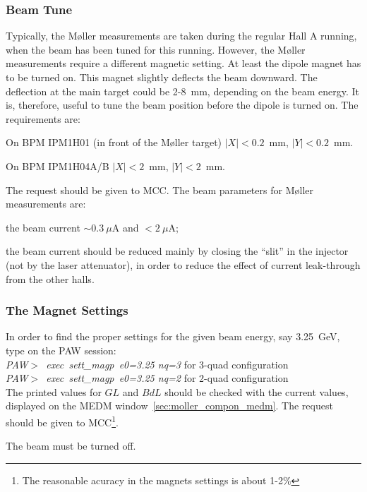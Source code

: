 {\subsubsection {Beam Tune}
\label{sec:moller_oper_beam}
 Typically, the M{\o}ller measurements are taken during the regular Hall A
 running, when the beam has been tuned for this running. However,
 the M{\o}ller measurements require a different magnetic setting.
 At least the dipole magnet has to be turned on. This magnet
 slightly deflects the beam downward. The deflection at the main target
 could be 2-8~mm, depending on the beam energy. It is, therefore, 
 useful to tune the beam position before the dipole is turned on.
 The requirements are: 
 \begin{list}{--}{\setlength{\itemsep}{-0.15cm}}
   \item On BPM IPM1H01 (in front of the M{\o}ller target) $|X|<0.2$~mm, $|Y|<0.2$~mm.
   \item On BPM IPM1H04A/B $|X|<2$~mm, $|Y|<2$~mm.
 \end{list}
 The request should be given to MCC. The beam parameters for M{\o}ller measurements
 are: 
   \begin{list}{--}{\setlength{\itemsep}{-0.15cm}}        
     \item \begin{safetyen}{5}{0} the beam current $\sim{}0.3~\mu$A and $<2~\mu$A;
            \end{safetyen}
     \item the beam current should be reduced mainly by closing the ``slit''
           in the injector (not by the laser attenuator), in order to
           reduce the effect of current leak-through from the other halls.
   \end{list}

\subsubsection {The Magnet Settings}
\label{sec:moller_oper_magset}
 In order to find the proper settings for the given beam energy, say 3.25~GeV, 
 type on the PAW session: \\ 
 \hspace*{0.5cm} {\em PAW$>$~exec~sett\_magp~e0=3.25 nq=3} for 3-quad configuration \\
 \hspace*{0.5cm} {\em PAW$>$~exec~sett\_magp~e0=3.25 nq=2} for 2-quad configuration \\
 The printed values for $GL$ and $BdL$ should be checked with the current values,
 displayed on the MEDM window~\ref{sec:moller_compon_medm}. 
 The request should be given to MCC\footnote{The reasonable acuracy in the  
 magnets settings is about 1-2\%}.
 \begin{safetyen}{5}{2}
   The beam must be turned off.
 \end{safetyen}

}
